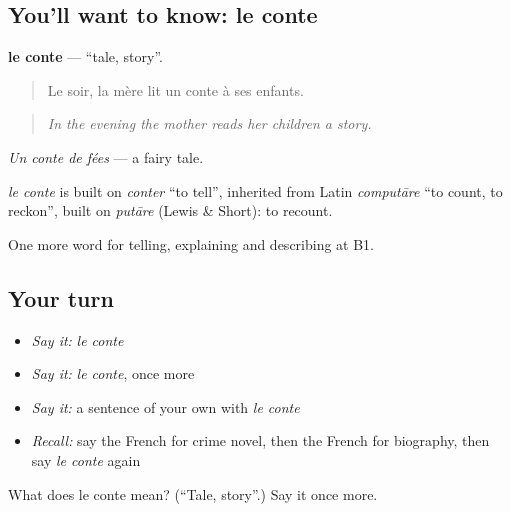 \subsection*{You'll want to know: le conte}
\textbf{le conte} — \textquotedblleft{}tale, story\textquotedblright{}.

\begin{quote}
Le soir, la mère lit un conte à ses enfants.
\end{quote}

\begin{quote}
\emph{In the evening the mother reads her children a story.}
\end{quote}

\emph{Un conte de fées} — a fairy tale.

\begin{cousinweb}
\emph{le conte} is built on \emph{conter} \textquotedblleft{}to tell\textquotedblright{}, inherited from Latin \emph{computāre} \textquotedblleft{}to count, to reckon\textquotedblright{}, built on \emph{putāre} (Lewis \& Short): to recount.
\end{cousinweb}

\begin{grammarlens}[title={What you've built}]
One more word for telling, explaining and describing at B1.
\end{grammarlens}

\subsection*{Your turn}
\begin{itemize}
\raggedright
  \item \emph{Say it:} \emph{le conte}
  \item \emph{Say it:} \emph{le conte}, once more
  \item \emph{Say it:} a sentence of your own with \emph{le conte}
  \item \emph{Recall:} say the French for crime novel, then the French for biography, then say \emph{le conte} again
\end{itemize}

\begin{tcolorbox}[breakable,colback=teal!4,colframe=teal!35!black,title={Before you move on}]
What does le conte mean? (\textquotedblleft{}Tale, story\textquotedblright{}.) Say it once more.
\end{tcolorbox}
